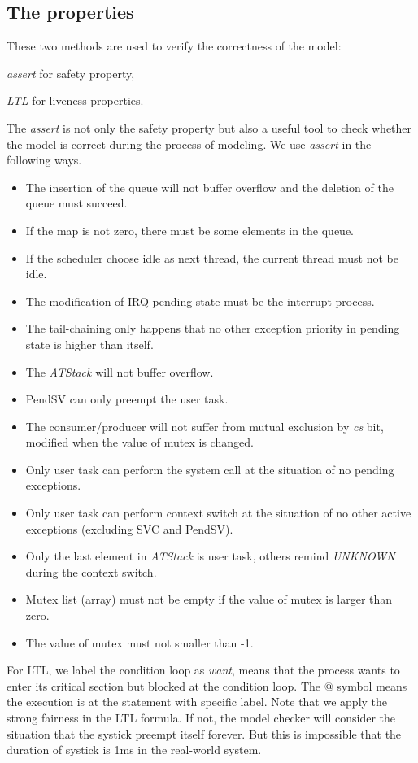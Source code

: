 \subsection{The properties} These two methods are used to verify the correctness of the model:
\begin{enumerate*}[label={\roman*)},font={\bfseries}]
\item \textit{assert} for safety property,
\item \textit{LTL} for liveness properties.
\end{enumerate*}
The \textit{assert} is not only the safety property but also a useful tool to check whether the model is correct during the process of modeling. We use \textit{assert} in the following ways.
\begin{itemize}
\item The insertion of the queue will not buffer overflow and the deletion of the queue must succeed.
\item If the map is not zero, there must be some elements in the queue.
\item If the scheduler choose idle as next thread, the current thread must not be idle.
\item The modification of IRQ pending state must be the interrupt process.
\item The tail-chaining only happens that no other exception priority in pending state is higher than itself.
\item The \textit{ATStack} will not buffer overflow.
\item PendSV can only preempt the user task.
\item The consumer/producer will not suffer from mutual exclusion by \textit{cs} bit, modified when the value of mutex is changed.
\item Only user task can perform the system call at the situation of no pending exceptions.
\item Only user task can perform context switch at the situation of no other active exceptions (excluding SVC and PendSV).
\item Only the last element in \textit{ATStack} is user task, others remind \textit{UNKNOWN} during the context switch.
\item Mutex list (array) must not be empty if the value of mutex is larger than zero.
\item The value of mutex must not smaller than -1.
\end{itemize}
For LTL, we label the condition loop as \textit{want}, means that the process wants to enter its critical section but blocked at the condition loop. The $@$ symbol means the execution is at the statement with specific label. Note that we apply the strong fairness in the LTL formula. If not, the model checker will consider the situation that the systick preempt itself forever. But this is impossible that the duration of systick is 1ms in the real-world system.

